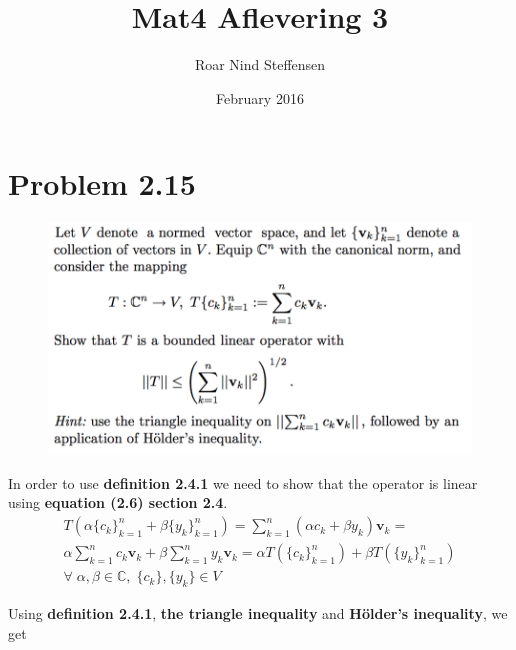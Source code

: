 \documentclass{article}
\title{Mat4 Aflevering 3}
\author{Roar Nind Steffensen}
\date{February 2016}
\begin{document}
\maketitle

\section*{Problem 2.15}
\begin{figure}[h!]
    \centering
    \includegraphics[width=\textwidth]{Fig/prob215}
\end{figure}
In order to use \textbf{definition 2.4.1} we need to show that the operator is linear using \textbf{equation (2.6) section 2.4}.
\begin{gather*}
    T (\alpha \{c_k\}_{k=1}^n + \beta \{y_k\}_{k=1}^n) = \sum_{k=1}^n \left(\alpha c_k + \beta y_k \right ) \mathbf{v}_k= \\
    \alpha\sum_{k=1}^n  c_k \mathbf{v}_k +\beta\sum_{k=1}^n  y_k \mathbf{v}_k = 
    \alpha T(\{c_k\}_{k=1}^n) + \beta T(\{y_k\}_{k=1}^n)  \\ \forall \; \alpha, \beta \in \mathbb{C}, \; \{c_k\},\{y_k\} \in V
\end{gather*}


Using \textbf{definition 2.4.1}, \textbf{the triangle inequality} and \textbf{Hölder's inequality}, we get
\end{document}
